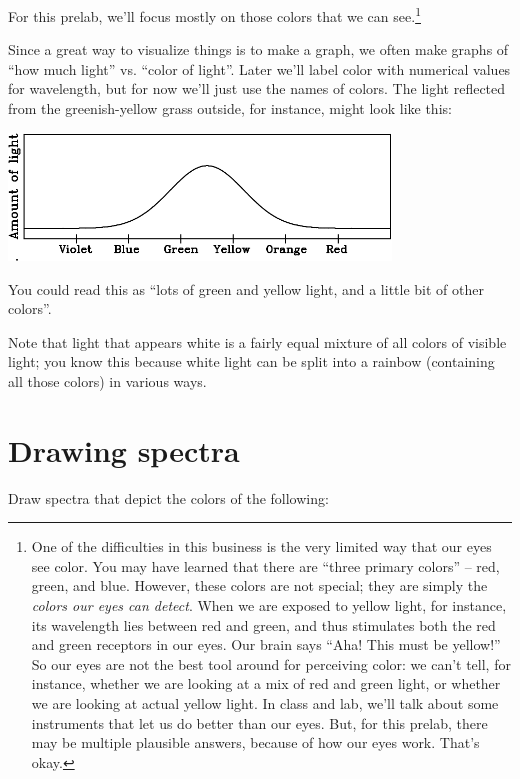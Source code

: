 \documentclass[11pt]{article}
\begin{document}
For this prelab, we'll focus mostly on those colors that we can see.\footnote{One of the difficulties in this business is the very limited way that our eyes see color. You may have learned that there are ``three primary colors'' -- red, green, and blue. However, these colors are not special; they are simply the {\it colors our eyes
can detect}. When we are exposed to yellow light, for instance, its wavelength lies between red and green, and thus stimulates both the red and green receptors in our eyes. Our brain says ``Aha! This must be yellow!'' So our eyes are not the best tool around
for perceiving color: we can't tell, for instance, whether we are looking at a mix of red and green light, or whether we are looking at actual yellow light. In class and lab, we'll talk about some instruments that let us do better than our eyes. But, for this prelab,
there may be multiple plausible answers, because of how our eyes work. That's okay.}

Since a great way to visualize things is to make a graph, we often make graphs of ``how much light'' vs. ``color of light''. Later we'll label color with numerical values for wavelength, but for now we'll just use the names of colors. The light reflected from the 
greenish-yellow grass outside, for instance, might look like this:


\begin{center}
\includegraphics[width=4in]{green-yellow-crop.pdf}
\end{center}

You could read this as ``lots of green and yellow light, and a little bit of other colors''. 

Note that light that appears white is a fairly equal mixture of all colors of visible light; you know this because white light can be split into a rainbow (containing all those colors) in various ways.

\section{Drawing spectra}

Draw spectra that depict the colors of the following:
\end{document}
